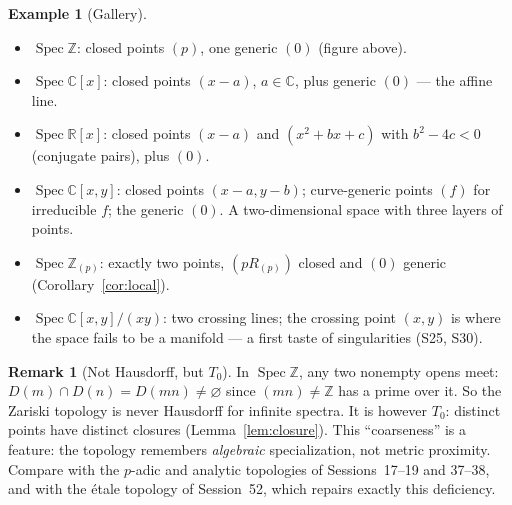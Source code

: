 \documentclass[11pt,a4paper]{article}
\theoremstyle{definition}
\newtheorem{example}[theorem]{Example}
\newtheorem{remark}[theorem]{Remark}
\newcommand{\Z}{\mathbb{Z}}
\newcommand{\R}{\mathbb{R}}
\newcommand{\C}{\mathbb{C}}
\newcommand{\Spec}{\operatorname{Spec}}
\begin{document}
	\begin{example}[Gallery]
		\begin{itemize}
			\item $\Spec\Z$: closed points $(p)$, one generic $(0)$ (figure above).
			\item $\Spec\C[x]$: closed points $(x-a)$, $a\in\C$, plus generic $(0)$ --- the affine line.
			\item $\Spec\R[x]$: closed points $(x-a)$ and $(x^2+bx+c)$ with $b^2-4c<0$ (conjugate pairs), plus $(0)$.
			\item $\Spec\C[x,y]$: closed points $(x-a,y-b)$; curve-generic points $(f)$ for irreducible $f$;
			the generic $(0)$. A two-dimensional space with three layers of points.
			\item $\Spec\Z_{(p)}$: exactly two points, $(pR_{(p)})$ closed and $(0)$ generic (Corollary~\ref{cor:local}).
			\item $\Spec\C[x,y]/(xy)$: two crossing lines; the crossing point $(x,y)$ is where the space fails
			to be a manifold --- a first taste of singularities (S25, S30).
		\end{itemize}
	\end{example}
	
	\begin{remark}[Not Hausdorff, but $T_0$]
		In $\Spec\Z$, any two nonempty opens meet: $D(m)\cap D(n)=D(mn)\neq\varnothing$ since $(mn)\neq\Z$ has
		a prime over it. So the Zariski topology is never Hausdorff for infinite spectra. It is however $T_0$:
		distinct points have distinct closures (Lemma~\ref{lem:closure}). This ``coarseness'' is a feature:
		the topology remembers \emph{algebraic} specialization, not metric proximity. Compare with the
		$p$-adic and analytic topologies of Sessions~17--19 and 37--38, and with the \'etale topology of
		Session~52, which repairs exactly this deficiency.
	\end{remark}
	
\end{document}
